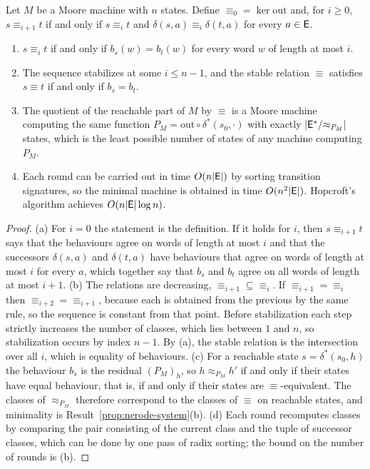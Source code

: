 \begin{established}\label{thm:moore}
Let $M$ be a Moore machine with $n$ states. Define $\equiv_0=\ker\mathrm{out}$ and, for $i\ge0$, $s\equiv_{i+1}t$ if and only if $s\equiv_it$ and $\delta(s,a)\equiv_i\delta(t,a)$ for every $a\in\mathsf{E}$.
\begin{enumerate}[nosep,label=(\alph*)]
  \item $s\equiv_it$ if and only if $b_s(w)=b_t(w)$ for every word $w$ of length at most $i$.
  \item The sequence stabilizes at some $i\le n-1$, and the stable relation $\equiv$ satisfies $s\equiv t$ if and only if $b_s=b_t$.
  \item The quotient of the reachable part of $M$ by $\equiv$ is a Moore machine computing the same function $P_M=\mathrm{out}\circ\delta^{*}(s_0,\cdot)$ with exactly $|\mathsf{E}^{*}/{\approx_{P_M}}|$ states, which is the least possible number of states of any machine computing $P_M$.
  \item Each round can be carried out in time $O(n|\mathsf{E}|)$ by sorting transition signatures, so the minimal machine is obtained in time $O(n^{2}|\mathsf{E}|)$. Hopcroft's algorithm achieves $O(n|\mathsf{E}|\log n)$.
\end{enumerate}
\end{established}
\begin{proof}
(a) For $i=0$ the statement is the definition. If it holds for $i$, then $s\equiv_{i+1}t$ says that the behaviours agree on words of length at most $i$ and that the successors $\delta(s,a)$ and $\delta(t,a)$ have behaviours that agree on words of length at most $i$ for every $a$, which together say that $b_s$ and $b_t$ agree on all words of length at most $i+1$. (b) The relations are decreasing, ${\equiv_{i+1}}\subseteq{\equiv_i}$. If $\equiv_{i+1}=\equiv_i$ then $\equiv_{i+2}=\equiv_{i+1}$, because each is obtained from the previous by the same rule, so the sequence is constant from that point. Before stabilization each step strictly increases the number of classes, which lies between $1$ and $n$, so stabilization occurs by index $n-1$. By (a), the stable relation is the intersection over all $i$, which is equality of behaviours. (c) For a reachable state $s=\delta^{*}(s_0,h)$ the behaviour $b_s$ is the residual $(P_M)_h$, so $h\approx_{P_M}h'$ if and only if their states have equal behaviour, that is, if and only if their states are $\equiv$-equivalent. The classes of $\approx_{P_M}$ therefore correspond to the classes of $\equiv$ on reachable states, and minimality is Result~\ref{prop:nerode-system}(b). (d) Each round recomputes classes by comparing the pair consisting of the current class and the tuple of successor classes, which can be done by one pass of radix sorting; the bound on the number of rounds is (b).
\end{proof}

